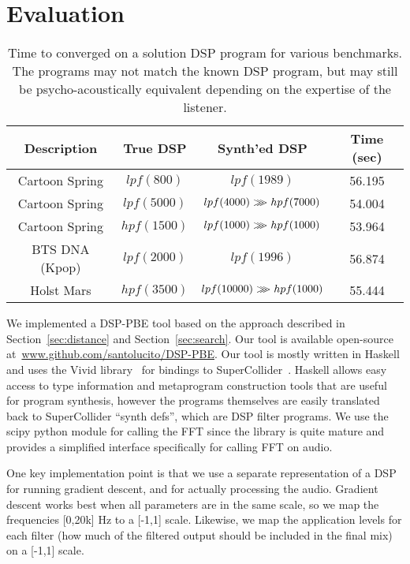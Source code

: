 \section{Evaluation}
\begin{table*}[!ht]
\centering
\setlength\tabcolsep{2em}
\begin{tabular}{|c | c | c | c |} 
 \hline
 Description & True DSP & Synth'ed DSP & Time (sec) \\ 
 \hline\hline
 Cartoon Spring & $lpf(800)  $ & $lpf(1989) $ & 56.195 \\
 Cartoon Spring & $lpf(5000) $ & $lpf(4000) >\mkern-9mu>\mkern-9mu> hpf(7000) $ & 54.004 \\
 Cartoon Spring & $hpf(1500) $ & $lpf(1000) >\mkern-9mu>\mkern-9mu> hpf(1000) $ & 53.964 \\
 BTS DNA (Kpop) & $lpf(2000) $ & $lpf(1996)	 $ & 56.874 \\
 Holst Mars     & $hpf(3500) $ & $lpf(10000) >\mkern-9mu>\mkern-9mu> hpf(1000)$  & 55.444 \\
 \hline
\end{tabular}
\caption{Time to converged on a solution DSP program for various benchmarks. The programs may not match the known DSP program, but may still be psycho-acoustically equivalent depending on the expertise of the listener. }
\label{table:eval}
\end{table*}

We implemented a DSP-PBE tool based on the approach described in Section~\ref{sec:distance} and Section~\ref{sec:search}.
Our tool is available open-source at~\url{www.github.com/santolucito/DSP-PBE}.
Our tool is mostly written in Haskell and uses the Vivid library~\cite{vivid} for bindings to SuperCollider~\cite{supercollider}.
Haskell allows easy access to type information and metaprogram construction tools that are useful for program synthesis, however the programs themselves are easily translated back to SuperCollider ``synth defs'', which are DSP filter programs.
We use the scipy python module for calling the FFT since the library is quite mature and provides a simplified interface specifically for calling FFT on audio.

One key implementation point is that we use a separate representation of a DSP for running gradient descent, and for actually processing the audio.
Gradient descent works best when all parameters are in the same scale, so we map the frequencies [0,20k] Hz to a [-1,1] scale.
Likewise, we map the application levels for each filter (how much of the filtered output should be included in the final mix) on a [-1,1] scale.

